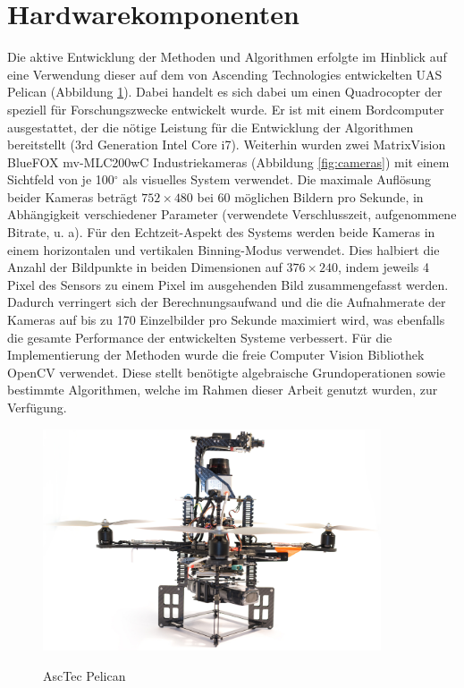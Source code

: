\section{Hardwarekomponenten}
\label{sec:setup}

Die aktive Entwicklung der Methoden und Algorithmen erfolgte im Hinblick auf eine Verwendung dieser auf dem von Ascending Technologies\linebreak  \cite{asctec} entwickelten UAS Pelican (Abbildung \ref{fig:pelican}). Dabei handelt es sich dabei um einen Quadrocopter der speziell für Forschungszwecke entwickelt wurde. Er ist mit einem Bordcomputer ausgestattet, der die nötige Leistung für die Entwicklung der Algorithmen bereitstellt (3rd Generation Intel Core i7). Weiterhin wurden zwei MatrixVision BlueFOX mv-MLC200wC Industriekameras \cite{matrixvision} (Abbildung \ref{fig:cameras}) mit einem Sichtfeld von je 100$^\circ$ als visuelles System verwendet. Die maximale Auflösung beider Kameras beträgt $752\times480$ bei 60 möglichen Bildern pro Sekunde, in Abhängigkeit verschiedener Parameter (verwendete Verschlusszeit, aufgenommene Bitrate, u. a). Für den Echtzeit-Aspekt des Systems werden beide Kameras in einem horizontalen und vertikalen Binning-Modus verwendet. Dies halbiert die Anzahl der Bildpunkte in beiden Dimensionen auf $376\times240$, indem jeweils 4 Pixel des Sensors zu einem Pixel im ausgehenden Bild zusammengefasst werden. Dadurch verringert sich der Berechnungsaufwand und die die Aufnahmerate der Kameras auf bis zu 170 Einzelbilder pro Sekunde maximiert wird, was ebenfalls die gesamte Performance der entwickelten Systeme verbessert. Für die Implementierung der Methoden wurde die freie Computer Vision Bibliothek OpenCV \cite{opencv} verwendet. Diese stellt benötigte algebraische Grundoperationen sowie bestimmte Algorithmen, welche im Rahmen dieser Arbeit genutzt wurden, zur Verfügung.

\begin{figure}[h]
	\centering
	\includegraphics[width=10cm]{img/pelican}\\
	\caption{AscTec Pelican \cite{asctec}}
	\label{fig:pelican}
\end{figure}

